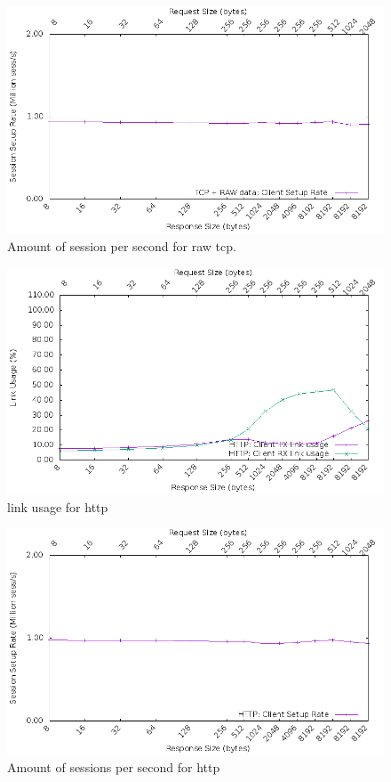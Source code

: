 \begin{figure}[H]
  \includegraphics[scale=0.6]{images/raw_setup.png}
  \caption{Amount of session per second for raw tcp.}
  \label{fig:rawtcpsession}
\end{figure}

\begin{figure}[H]
  \includegraphics[scale=0.6]{images/http_link_usage.png}
  \caption{link usage for http}
  \label{fig:httplink}
\end{figure}

\begin{figure}[H]
  \includegraphics[scale=0.6]{images/http_setup.png}
  \caption{Amount of sessions per second for http}
  \label{fig:httpsession}
\end{figure}


